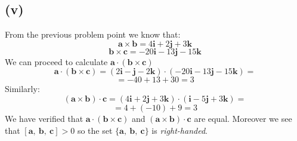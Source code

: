 \documentclass{article}
\begin{document}
\subsection*{(v)}
From the previous problem point we know that:
\begin{equation*}
    \textbf{a} \times \textbf{b} = 4\textbf{i} + 2\textbf{j} + 3\textbf{k}
\end{equation*}
\begin{equation*}
    \textbf{b} \times \textbf{c} = -20\textbf{i} -13\textbf{j}  -15\textbf{k}
\end{equation*}
We can proceed to calculate \(\textbf{a} \cdot (\textbf{b} \times \textbf{c}) \)
\begin{equation*}
    \textbf{a} \cdot (\textbf{b} \times \textbf{c}) = (2\textbf{i} - \textbf{j} - 2\textbf{k}) \cdot (-20\textbf{i} -13\textbf{j}  -15\textbf{k}) =
\end{equation*}
\begin{equation*}
    = -40  + 13  + 30 = 3
\end{equation*}
Similarly:
\begin{equation*}
    (\textbf{a} \times \textbf{b}) \cdot \textbf{c} = (4\textbf{i} + 2\textbf{j} + 3\textbf{k}) \cdot (\textbf{i} -5\textbf{j} + 3\textbf{k}) =
\end{equation*}
\begin{equation*}
    = 4 + (-10) + 9 = 3
\end{equation*}
We have verified that \(\textbf{a} \cdot (\textbf{b} \times \textbf{c})\) and \((\textbf{a} \times \textbf{b}) \cdot \textbf{c}\)
are equal. Moreover we see that \( [ \textbf{a}, \ \textbf{b}, \ \textbf{c}] > 0\) so the set \(\{\textbf{a}, \ \textbf{b}, \ \textbf{c}\}\)
is \emph{right-handed}.
\end{document}
